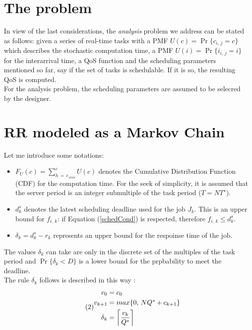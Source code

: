 \section{The problem}
In view of the last considerations, the \emph{analysis} problem we address can be stated as follows: given a series of real-time tasks with a PMF \( U(c) = \Pr\{c_{i,\,j} = c\} \) which describes the stochastic computation time, a PMF \( U(i) = \Pr\{i_{i,\,j} = i\} \) for the interarrival time, a QoS function and the scheduling parameters mentioned so far, say if the set of tasks is schedulable. If it is so, the resulting QoS is computed.\\
For the analysis problem, the scheduling parameters are assumed to be selecred by the designer.

\section{RR modeled as a Markov Chain}
Let me introduce some notations:
\begin{itemize}
  \item \( F_{U}(c) = \displaystyle\sum_{h\,=\,c_{\,min}}^{c} U(c) \) denotes the Cumulative Distribution Function (CDF) for the computation time. For the seek of simplicity, it is assumed that the server period is an integer submultiple of the task period (\( T = NT^{s} \)).
  \item \( d_{k}^{s} \) denotes the latest scheduling deadline used for the job \( J_{k} \). This is an upper bound for \( f_{i,\,k} \): if Equation (\ref{schedCond}) is respected, therefore \( f_{i,\,k} \leq d_{k}^{s} \).
  \item \( \delta_{k} = d_{k}^{s} - r_{k} \) represents an upper bound for the respoinse time of the job.
\end{itemize}

The values \( \delta_{k} \) can take are only in the discrete set of the multiples of the task period and \( \Pr\{\delta_{k} < D\} \) is a lower bound for the prpbability to meet the deadline.\\
The rule \( \delta_{k} \) follows is described in this way \cite{probGuarantees}:
\begin{equation} \tag{2} \label{markovProcess}
\begin{split}
  v_{0} &= c_{0}\\
  v_{k+1} &= max\{0,\,NQ^{s} + c_{k+1}\}\\
  \delta_{k} &= \ceil[\bigg]{\frac{v_{k}}{Q^{s}}}
\end{split}
\end{equation}

